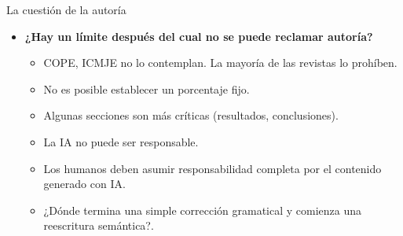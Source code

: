\begin{frame}{La cuestión de la autoría}
    \begin{itemize}
        \item \textbf{¿Hay un límite después del cual no se puede reclamar autoría?}
              \begin{itemize}
                  \item COPE, ICMJE no lo contemplan. La mayoría de las revistas lo prohíben.
                  \item No es posible establecer un porcentaje fijo.
                  \item Algunas secciones son más críticas (resultados, conclusiones).
                  \item La IA no puede ser responsable.
                  \item Los humanos deben asumir responsabilidad completa por el contenido generado con IA.
                  \item ¿Dónde termina una simple corrección gramatical y comienza una reescritura semántica?.
              \end{itemize}

    \end{itemize}

\end{frame}
